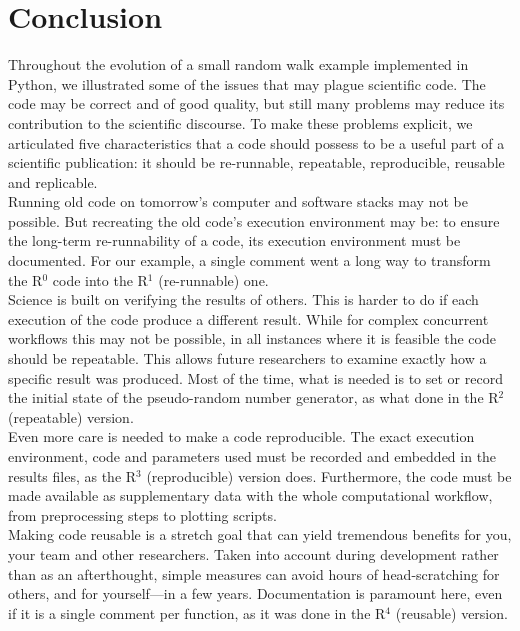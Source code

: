 \documentclass[a4paper,11pt]{article}
\begin{document}
\section*{Conclusion}

Throughout the evolution of a small random walk example implemented in Python, we illustrated some of the issues that may plague scientific code. The code may be correct and of good quality, but still many problems may reduce its contribution to the scientific discourse.
To make these problems explicit, we articulated five characteristics that a code should possess to be a useful part of a scientific publication: it should be re-runnable, repeatable, reproducible, reusable and replicable.\\

Running old code on tomorrow’s computer and software stacks may not be possible. But recreating the old code’s execution environment may be: to ensure the long-term re-runnability of a code, its execution environment must be documented. For our example, a single comment went a long way to transform the R$^0$ code into the R$^1$ (re-runnable) one.\\

Science is built on verifying the results of others. This is harder to do if each execution of the code produce a different result. While for complex concurrent workflows this may not be possible, in all instances where it is feasible the code should be repeatable. This allows future researchers to examine exactly how a specific result was produced. Most of the time, what is needed is to set or record the initial state of the pseudo-random number generator, as what done in the R$^2$ (repeatable) version.\\

Even more care is needed to make a code reproducible. The exact execution environment, code and parameters used must be recorded and embedded in the results files, as the R$^3$ (reproducible) version does. Furthermore, the code must be made available as supplementary data with the whole computational workflow, from preprocessing steps to plotting scripts.\\

Making code reusable is a stretch goal that can yield tremendous benefits for you, your team and other researchers. Taken into account during development rather than as an afterthought, simple measures can avoid hours of head-scratching for others, and for yourself—in a few years. Documentation is paramount here, even if it is a single comment per function, as it was done in the R$^4$ (reusable) version.\\
\end{document}

